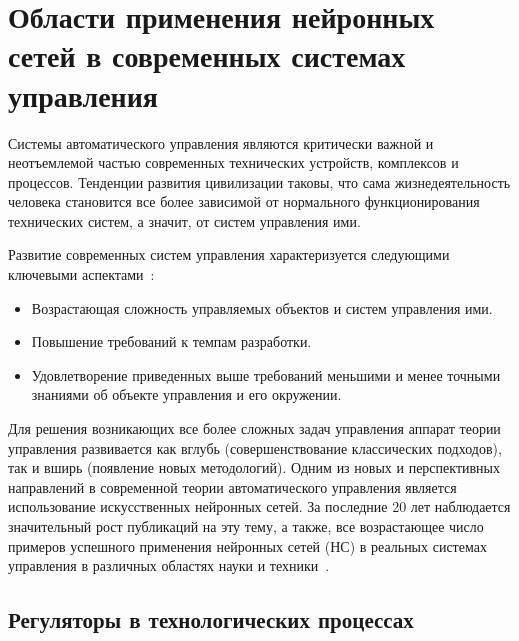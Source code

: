 
\section{Области применения нейронных сетей в современных системах
         управления}%


Системы автоматического управления являются критически важной и
неотъемлемой частью современных технических устройств, комплексов и
процессов.  Тенденции развития цивилизации таковы, что сама
жизнедеятельность человека становится все более зависимой от
нормального функционирования технических систем, а значит, от систем
управления ими.

Развитие современных систем управления характеризуется следующими
ключевыми аспектами~\cite{kulee96}:

\begin{itemize}

\item
Возрастающая сложность управляемых объектов и систем управления ими.

\item
Повышение требований к темпам разработки.

\item
Удовлетворение приведенных выше требований меньшими и менее точными
знаниями об объекте управления и его окружении.

\end{itemize}

Для решения возникающих все более сложных задач управления аппарат
теории управления развивается как вглубь (совершенствование
классических подходов), так и вширь (появление новых методологий).
Одним из новых и перспективных направлений в современной теории
автоматического управления является использование искусственных
нейронных сетей.  За последние 20 лет наблюдается значительный рост
публикаций на эту тему, а также, все возрастающее число примеров
успешного применения нейронных сетей (НС) в реальных системах
управления в различных областях науки и техники~\cite{bondlog97}.


\subsection{Регуляторы в технологических процессах}

